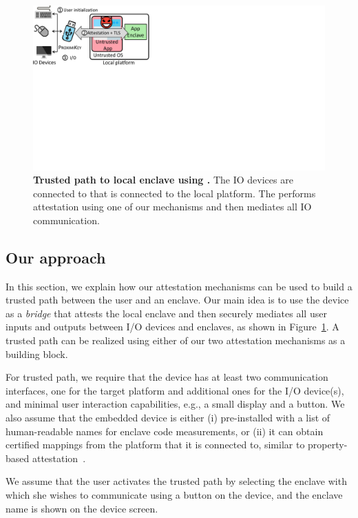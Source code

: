\begin{figure}[t]
 \centering
 \includegraphics[trim={0 12cm 20cm 0},clip,width=0.65\linewidth]{chapters/ProximiTEE/images_new/trustedPath.pdf}
 \caption[Trusted path to local enclave using \device]{\textbf{Trusted path to local enclave using \device.} The IO devices are connected to \device that is connected to the local platform. The \device performs attestation using one of our mechanisms and then mediates all IO communication.}

 \label{fig:secureInput}
\end{figure}

\subsection{Our approach}

In this section, we explain how our attestation mechanisms can be used to build a trusted path between the user and an enclave. Our main idea is to use the \device device as a \emph{bridge} that attests the local enclave and then securely mediates all user inputs and outputs between I/O devices and enclaves, as shown in Figure~\ref{fig:secureInput}. A trusted path can be realized using either of our two attestation mechanisms as a building block.

For trusted path, we require that the \device device has at least two communication interfaces, one for the target platform and additional ones for the I/O device(s), and minimal user interaction capabilities, e.g., a small display and a button. We also assume that the embedded device is either (i) pre-installed with a list of human-readable names for enclave code measurements, or (ii) it can obtain certified mappings from the platform that it is connected to, similar to property-based attestation~\cite{SadeghiProperty}.

We assume that the user activates the trusted path by selecting the enclave with which she wishes to communicate using a button on the device, and the enclave name is shown on the device screen.%

